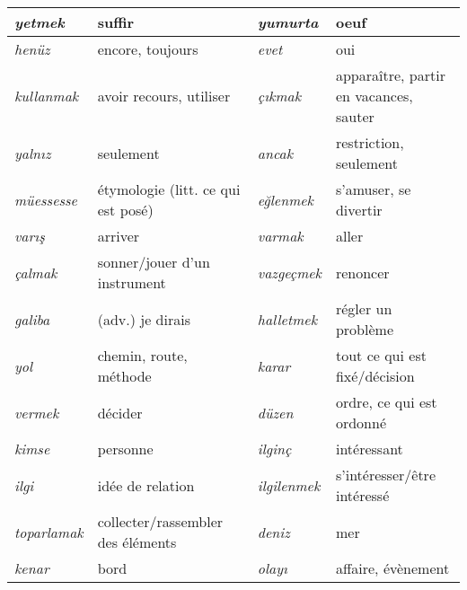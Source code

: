 \documentclass{cours}
\newcommand{\ch}{\c{s}}
\newcommand{\ug}{\u{g}}
\begin{document}
\begin{longtable}{>{\sl}m{}m{}|>{\sl}m{}m{}}
    \midrule
    yetmek           & suffir                                               & yumurta         & oeuf                                   \\
    \midrule
    henüz            & encore, toujours                                     & evet            & oui                                    \\
    \midrule
    kullanmak        & avoir recours, utiliser                              & ç\i kmak        & apparaître, partir en vacances, sauter \\
    \midrule
    yaln\i z         & seulement                                            & ancak           & restriction, seulement                 \\
    \midrule
    müessesse        & étymologie (litt. ce qui est posé)                   & e\ug lenmek     & s'amuser, se divertir                  \\
    \midrule
    var\i \ch        & arriver                                              & varmak          & aller                                  \\
    \midrule
    çalmak           & sonner/jouer d'un instrument                         & vazgeçmek       & renoncer                               \\
    \midrule
    galiba           & (adv.) je dirais                                     & halletmek       & régler un problème                     \\
    \midrule
    yol              & chemin, route, méthode                               & karar           & tout ce qui est fixé/décision          \\
    \midrule
    vermek           & décider                                              & düzen           & ordre, ce qui est ordonné              \\
    \midrule
    kimse            & personne                                             & ilginç          & intéressant                            \\
    \midrule
    ilgi             & idée de relation                                     & ilgilenmek      & s'intéresser/être intéressé            \\
    \midrule
    toparlamak       & collecter/rassembler des éléments                    & deniz           & mer \\
    \midrule 
    kenar & bord & olay\i & affaire, évènement
\end{longtable}
\end{document}
